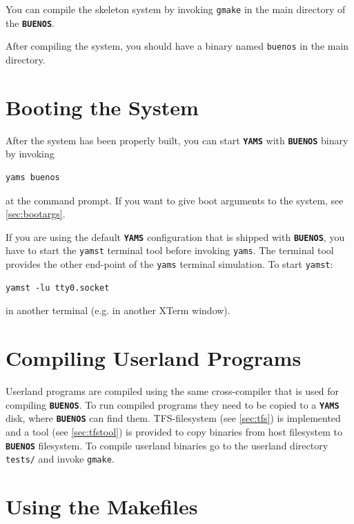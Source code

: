 \documentclass[twoside,a4paper]{report}
\newcommand{\buenos}{\texttt{\textbf{BUENOS}}}
\newcommand{\yams}{\texttt{\textbf{YAMS}}}
\begin{document}
You can compile the skeleton system by invoking \texttt{gmake} in the
main directory of the \buenos{}.

After compiling the system, you should have a binary named
\texttt{buenos} in the main directory.


\section{Booting the System}
\label{sec:booting}

After the system has been properly built, you can start \yams{} with
\buenos{} binary by invoking
\begin{verbatim}
yams buenos
\end{verbatim}
at the command prompt. If you want to give boot arguments to the
system, see \autoref{sec:bootargs}.

If you are using the default \yams{} configuration that is shipped
with \buenos{}, you have to start the \texttt{yamst} terminal tool
before invoking \texttt{yams}. The terminal tool provides the other
end-point of the \texttt{yams} terminal simulation. To start
\texttt{yamst}:
\begin{verbatim}
yamst -lu tty0.socket
\end{verbatim}
in another terminal (e.g. in another XTerm window).


\section{Compiling Userland Programs}
\label{sec:compilinguserland}

Userland programs are compiled using the same cross-compiler that is
used for compiling \buenos{}. To run compiled programs they need to be
copied to a \yams{} disk, where \buenos{} can find
them. TFS-filesystem (see \autoref{sec:tfs}) is implemented and a tool
(see \autoref{sec:tfstool}) is provided to copy binaries from host
filesystem to \buenos{} filesystem. To compile userland binaries go to
the userland directory \texttt{tests/} and invoke \texttt{gmake}.


\section{Using the Makefiles}
\label{sec:makefiles}
\end{document}
